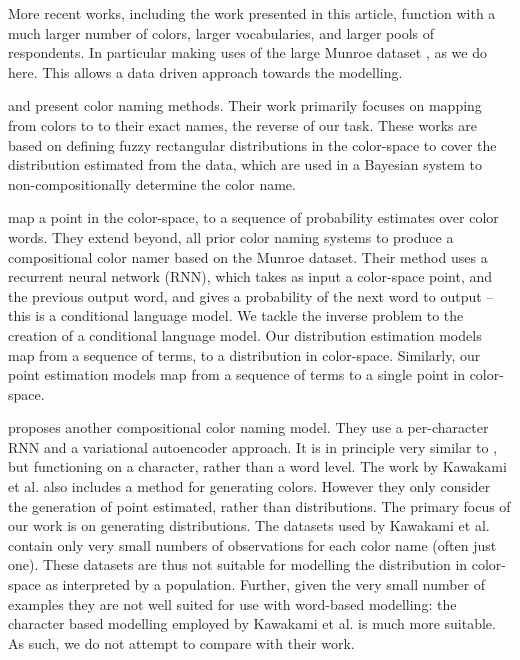\documentclass[]{clv3}
\newcommand{\textcite}{\citet}
\begin{document}
More recent works, including the work presented in this article, function with a much larger number of colors, larger vocabularies, and larger pools of respondents.
In particular making uses of the large Munroe dataset \textcite{Munroe2010XKCDdataset}, as we do here.
This allows a data driven approach towards the modelling.


\textcite{mcmahan2015bayesian} and \textcite{meomcmahanstone:color} present color naming methods.
Their work primarily focuses on mapping from colors to to their exact names, the reverse of our task.
These works are based on defining fuzzy rectangular distributions in the color-space to cover the distribution estimated from the data, which are used in a Bayesian system to non-compositionally determine the color name.


\textcite{2016arXiv160603821M} map a point in the color-space, to a sequence of probability estimates over color words.
They extend beyond, all prior color naming systems to produce a compositional color namer based on the Munroe dataset.
Their method uses a recurrent neural network (RNN), which takes as input a color-space point, and the previous output word, and gives a probability of the next word to output -- this is a conditional language model.
We tackle the inverse problem to the creation of a conditional language model.
Our distribution estimation models map from a sequence of terms, to a distribution in color-space.
Similarly, our point estimation models map from a sequence of terms to a single point in color-space.


\textcite{DBLP:journals/corr/KawakamiDRS16} proposes another compositional color naming model.
They use a per-character RNN and a variational autoencoder approach.
It is in principle very similar to \textcite{2016arXiv160603821M}, but functioning on a character, rather than a word level.
The work by Kawakami et al. also includes a method for generating colors.
However they only consider the generation of point estimated, rather than distributions.
The primary focus of our work is on generating distributions.
The datasets used by Kawakami et al. contain only very small numbers of observations for each color name (often just one).
These datasets are thus not suitable for modelling the distribution in color-space as interpreted by a population.
Further, given the very small number of examples they are not well suited for use with word-based modelling: the character based modelling employed by Kawakami et al. is much more suitable.
As such, we do not attempt to compare with their work.
\end{document}
